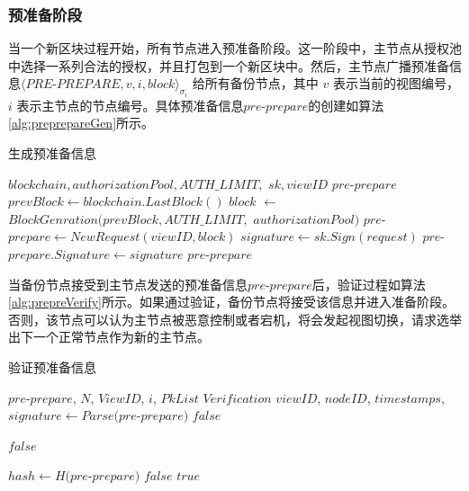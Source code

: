\subsubsection{预准备阶段}

当一个新区块过程开始，所有节点进入预准备阶段。这一阶段中，主节点从授权池中选择一系列合法的授权，并且打包到一个新区块中。然后，主节点广播预准备信息$\langle PRE$-$PREPARE, v, i, block \rangle_{\sigma_{i}}$ 给所有备份节点，其中 $v$ 表示当前的视图编号，$i$ 表示主节点的节点编号。具体预准备信息$pre$-$prepare$的创建如算法\ref{alg:preprepareGen}所示。

 \begin{algorithm}
 \caption{生成预准备信息}\label{alg:preprepareGen}
   \begin{algorithmic}[H]
   \renewcommand{\algorithmicrequire}{\textbf{Input:}}
   \renewcommand{\algorithmicensure}{\textbf{Output:}}
   \REQUIRE $blockchain, authorizationPool, AUTH\_LIMIT,$ $sk, viewID$
   \ENSURE  $pre$-$prepare$
    \STATE $prevBlock \gets blockchain.LastBlock()$
    \STATE $block$ $\gets$ $BlockGenration(prevBlock, AUTH\_LIMIT,$ $authorizationPool)$
    \STATE $pre$-$prepare \gets NewRequest(viewID, block)$
    \STATE $signature \gets sk.Sign(request)$
    \STATE $pre$-$prepare.Signature \gets signature$
   \RETURN $pre$-$prepare$
   \end{algorithmic}
 \end{algorithm}


当备份节点接受到主节点发送的预准备信息$pre$-$prepare$后，验证过程如算法\ref{alg:prepreVerify}所示。如果通过验证，备份节点将接受该信息并进入准备阶段。否则，该节点可以认为主节点被恶意控制或者宕机，将会发起视图切换，请求选举出下一个正常节点作为新的主节点。

 \begin{algorithm}
 \caption{验证预准备信息}
   \begin{algorithmic}[H]\label{alg:prepreVerify}
   \renewcommand{\algorithmicrequire}{\textbf{Input:}}
   \renewcommand{\algorithmicensure}{\textbf{Output:}}
   \REQUIRE $pre$-$prepare$, $N$, $ViewID$, $i$, $PkList$
   \ENSURE  $Verification$
    \STATE $viewID$, $nodeID$, $timestamps$, $signature \gets Parse(pre$-$prepare)$
      \RETURN $false$
    \ENDIF

      \RETURN $false$
    \ENDIF

    \STATE $hash \gets H(pre$-$prepare)$
      \RETURN $false$
    \ENDIF
   \RETURN $true$
   \end{algorithmic}
 \end{algorithm}


